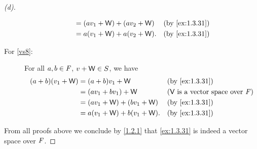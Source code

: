 \begin{proof}[(d)]
\begin{description}
\begin{align*}
				                           & = (av_1 + \W) + (av_2 + \W)  &  & \by{ex:1.3.31}                                \\
				                           & = a(v_1 + \W) + a(v_2 + \W). &  & \by{ex:1.3.31}
			\end{align*}
		\item[For \ref{vs8}:]
			For all \(a, b \in \mathit{F}\), \(v + \mathsf{W} \in S\), we have
			\begin{align*}
				(a + b) (v_1 + \W) & = (a + b) v_1 + \W           &  & \by{ex:1.3.31}                                \\
				                   & = (av_1 + bv_1) + \W         &  & \text{(\(\V\) is a vector space over \(\F\))} \\
				                   & = (av_1 + \W) + (bv_1 + \W)  &  & \by{ex:1.3.31}                                \\
				                   & = a(v_1 + \W) + b(v_1 + \W). &  & \by{ex:1.3.31}
			\end{align*}
	\end{description}
	From all proofs above we conclude by \cref{1.2.1} that \cref{ex:1.3.31} is indeed a vector space over \(\mathit{F}\).
\end{proof}
